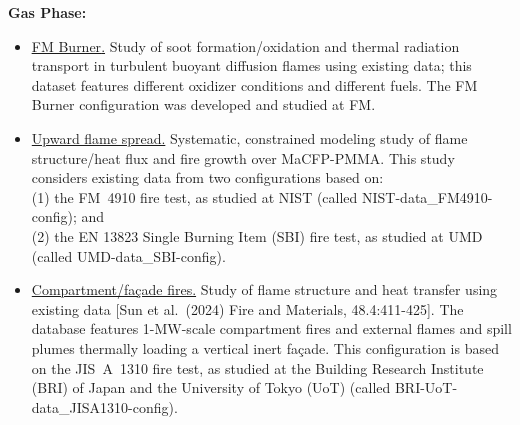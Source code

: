 \documentclass[12pt]{article}
\begin{document}
\textbf{Gas Phase:}
\begin{itemize} [noitemsep]
\small
    \item \underline{\href{https://github.com/MaCFP/macfp-db/tree/master/Extinction/FM_Burner}{FM Burner}.} Study of soot formation/oxidation and thermal radiation transport in turbulent buoyant diffusion flames using existing data; this dataset features different oxidizer conditions and different fuels. The FM Burner configuration was developed and studied at FM.
    \item \underline{Upward flame spread.} Systematic, constrained modeling study of flame structure/heat flux and fire growth over MaCFP-PMMA. This study considers existing data from two configurations based on:\\
    (1) the FM~4910 fire test, as studied at NIST (called NIST-data{\_}FM4910-config); and\\
    (2) the EN 13823 Single Burning Item (SBI) fire test, as studied at UMD (called UMD-data{\_}SBI-config).
    \item \underline{Compartment/façade fires.} Study of flame structure and heat transfer using existing data [Sun et al.~(2024) Fire and Materials, 48.4:411-425]. The database features 1-MW-scale compartment fires and external flames and spill plumes thermally loading a vertical inert façade. This configuration is based on the JIS~A~1310 fire test, as studied at the Building Research Institute (BRI) of Japan and the University of Tokyo (UoT) (called BRI-UoT-data{\_}JISA1310-config). 
\end{itemize}

\clearpage
\normalsize
\end{document}
